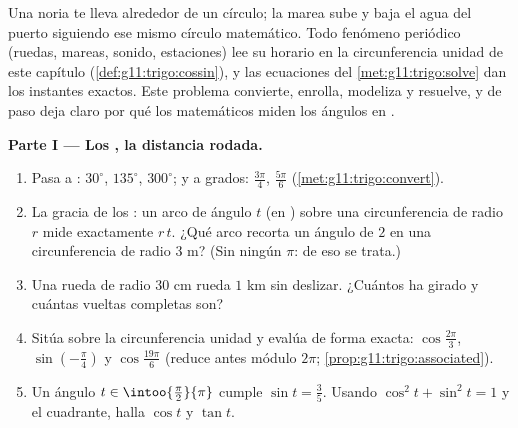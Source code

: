 \begin{problem}
\label{pb:g11:trigo:1}
Una noria te lleva alrededor de un círculo; la marea sube y baja el agua
del puerto siguiendo ese mismo círculo matemático. Todo fenómeno periódico
(ruedas, mareas, sonido, estaciones) lee su horario en la circunferencia
unidad de este capítulo (\cref{def:g11:trigo:cossin}), y las ecuaciones
del \cref{met:g11:trigo:solve} dan los instantes exactos. Este problema
convierte, enrolla, modeliza y resuelve, y de paso deja claro por qué los
matemáticos miden los ángulos en .

\medskip
\noindent\textbf{Parte I --- Los , la distancia rodada.}
\begin{enumerate}
  \item Pasa a : $30^\circ$, $135^\circ$, $300^\circ$; y a grados:
        $\frac{3\pi}{4}$, $\frac{5\pi}{6}$
        (\cref{met:g11:trigo:convert}).
  \item La gracia de los : un arco de ángulo $t$ (en )
        sobre una circunferencia de radio $r$ mide exactamente $r\,t$.
        ¿Qué arco recorta un ángulo de $2$  en una circunferencia
        de radio $3$ m? (Sin ningún $\pi$: de eso se trata.)
  \item Una rueda de radio $30$ cm rueda $1$ km sin deslizar. ¿Cuántos
        \emph{} ha girado y cuántas vueltas completas son?
  \item Sitúa sobre la circunferencia unidad y evalúa de forma exacta:
        $\cos\frac{2\pi}{3}$, $\sin\left(-\frac{\pi}{4}\right)$ y
        $\cos\frac{19\pi}{6}$ (reduce antes módulo $2\pi$;
        \cref{prop:g11:trigo:associated}).
  \item Un ángulo $t \in \intoo{\frac\pi2}{\pi}$ cumple
        $\sin t = \frac35$. Usando $\cos^2 t + \sin^2 t = 1$ y el
        cuadrante, halla $\cos t$ y $\tan t$.
\end{enumerate}


\end{problem}
